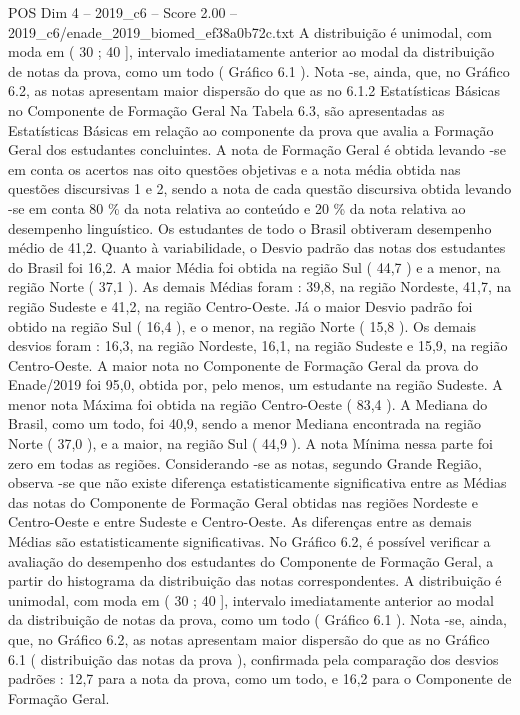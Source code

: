 \begin{textsample}{POS Dim 4 – 2019\_c6 – Score 2.00 – 2019\_c6/enade\_2019\_biomed\_ef38a0b72c.txt}
A distribuição é unimodal, com moda em ( 30 ; 40 ], intervalo imediatamente anterior ao modal da distribuição de notas da prova, como um todo ( Gráfico 6.1 ).
Nota -se, ainda, que, no Gráfico 6.2, as notas apresentam maior dispersão do que as no 6.1.2 Estatísticas Básicas no Componente de Formação Geral Na Tabela 6.3, são apresentadas as Estatísticas Básicas em relação ao componente da prova que avalia a Formação Geral dos estudantes concluintes.
A nota de Formação Geral é obtida levando -se em conta os acertos nas oito questões objetivas e a nota média obtida nas questões discursivas 1 e 2, sendo a nota de cada questão discursiva obtida levando -se em conta 80 \% da nota relativa ao conteúdo e 20 \% da nota relativa ao desempenho linguístico.
Os estudantes de todo o Brasil obtiveram desempenho médio de 41,2.
Quanto à variabilidade, o Desvio padrão das notas dos estudantes do Brasil foi 16,2.
A maior Média foi obtida na região Sul ( 44,7 ) e a menor, na região Norte ( 37,1 ).
As demais Médias foram : 39,8, na região Nordeste, 41,7, na região Sudeste e 41,2, na região Centro-Oeste.
Já o maior Desvio padrão foi obtido na região Sul ( 16,4 ), e o menor, na região Norte ( 15,8 ).
Os demais desvios foram : 16,3, na região Nordeste, 16,1, na região Sudeste e 15,9, na região Centro-Oeste.
A maior nota no Componente de Formação Geral da prova do Enade/2019 foi 95,0, obtida por, pelo menos, um estudante na região Sudeste.
A menor nota Máxima foi obtida na região Centro-Oeste ( 83,4 ).
A Mediana do Brasil, como um todo, foi 40,9, sendo a menor Mediana encontrada na região Norte ( 37,0 ), e a maior, na região Sul ( 44,9 ).
A nota Mínima nessa parte foi zero em todas as regiões.
Considerando -se as notas, segundo Grande Região, observa -se que não existe diferença estatisticamente significativa entre as Médias das notas do Componente de Formação Geral obtidas nas regiões Nordeste e Centro-Oeste e entre Sudeste e Centro-Oeste.
As diferenças entre as demais Médias são estatisticamente significativas.
No Gráfico 6.2, é possível verificar a avaliação do desempenho dos estudantes do Componente de Formação Geral, a partir do histograma da distribuição das notas correspondentes.
A distribuição é unimodal, com moda em ( 30 ; 40 ], intervalo imediatamente anterior ao modal da distribuição de notas da prova, como um todo ( Gráfico 6.1 ).
Nota -se, ainda, que, no Gráfico 6.2, as notas apresentam maior dispersão do que as no Gráfico 6.1 ( distribuição das notas da prova ), confirmada pela comparação dos desvios padrões : 12,7 para a nota da prova, como um todo, e 16,2 para o Componente de Formação Geral.

\end{textsample}

